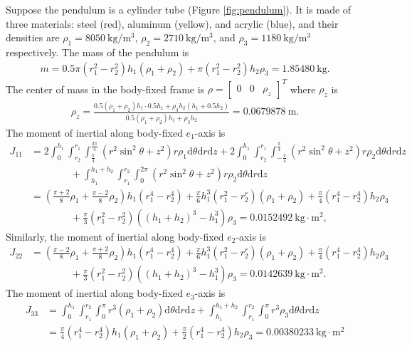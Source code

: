 \documentclass[10pt]{article}
\newcommand{\diff}[1]{\mathrm{d}#1}
\begin{document}
Suppose the pendulum is a cylinder tube (Figure \ref{fig:pendulum}).
It is made of three materials: steel (red), aluminum (yellow), and acrylic (blue), and their densities are $\rho_1 = \SI{8050}{\kilogram\per\meter^3}$, $\rho_2 = \SI{2710}{\kilogram\per\meter^3}$, and $\rho_3 = \SI{1180}{\kilogram\per\meter^3}$ respectively.
The mass of the pendulum is
\begin{align}
	m = 0.5\pi(r_1^2-r_2^2)h_1(\rho_1+\rho_2) + \pi(r_1^2-r_2^2)h_2\rho_3 = \SI{1.85480}{\kilogram}.
\end{align}
The center of mass in the body-fixed frame is $\rho = \begin{bmatrix} 0 & 0 & \rho_z \end{bmatrix}^T$ where $\rho_z$ is
\begin{align}
	\rho_z = \frac{0.5(\rho_1+\rho_2)h_1 \cdot 0.5h_1 + \rho_3h_2(h_1+0.5h_2)}{0.5(\rho_1+\rho_2)h_1 + \rho_3h_2} = \SI{0.0679878}{\meter}.
\end{align}
The moment of inertial along body-fixed $e_1$-axis is
\begin{align}
	J_{11} &= 2\int_0^{h_1}\int_{r_2}^{r_1}\int_{\frac{\pi}{4}}^{\frac{3\pi}{4}} (r^2\sin^2\theta + z^2) r\rho_1 \diff{\theta} \diff{r} \diff{z} + 2\int_0^{h_1}\int_{r_2}^{r_1}\int_{-\frac{\pi}{4}}^{\frac{\pi}{4}} (r^2\sin^2\theta + z^2) r\rho_2 \diff{\theta} \diff{r} \diff{z} \nonumber \\
	&\qquad\qquad + \int_{h_1}^{h_1+h_2} \int_{r_1}^{r_2} \int_0^{2\pi} (r^2\sin^2\theta + z^2) r\rho_2 \diff{\theta} \diff{r} \diff{z} \nonumber \\
	&= \left( \frac{\pi+2}{8}\rho_1 + \frac{\pi-2}{8}\rho_2 \right)h_1(r_1^4-r_2^4) + \frac{\pi}{6} h_1^3(r_1^2-r_2^r)(\rho_1+\rho_2) + \frac{\pi}{4}(r_1^4-r_2^4)h_2\rho_3 \nonumber \\
	&\qquad\qquad + \frac{\pi}{3}(r_1^2-r_2^2)((h_1+h_2)^3-h_1^3)\rho_3 = \SI{0.0152492}{\kilogram\cdot\meter^2},
\end{align}
Similarly, the moment of inertial along body-fixed $e_2$-axis is
\begin{align}
	J_{22} &= \left( \frac{\pi-2}{8}\rho_1 + \frac{\pi+2}{8}\rho_2 \right)h_1(r_1^4-r_2^4) + \frac{\pi}{6} h_1^3(r_1^2-r_2^r)(\rho_1+\rho_2) + \frac{\pi}{4}(r_1^4-r_2^4)h_2\rho_3 \nonumber \\
	&\qquad\qquad + \frac{\pi}{3}(r_1^2-r_2^2)((h_1+h_2)^3-h_1^3)\rho_3 = \SI{0.0142639}{\kilogram\cdot\meter^2}.
\end{align}
The moment of inertial along body-fixed $e_3$-axis is
\begin{align}
	J_{33} &= \int_0^{h_1} \int_{r_1}^{r_2} \int_0^{\pi} r^3(\rho_1+\rho_2) \diff{\theta} \diff{r} \diff{z} + \int_{h_1}^{h_1+h_2} \int_{r_1}^{r_2} \int_0^\pi r^3\rho_3 \diff{\theta} \diff{r} \diff{z} \nonumber \\
	&= \frac{\pi}{4}(r_1^4-r_2^4)h_1(\rho_1+\rho_2) + \frac{\pi}{2}(r_1^4-r_2^4)h_2\rho_3 = \SI{0.00380233}{\kilogram\cdot\meter^2}
\end{align}
\end{document}
